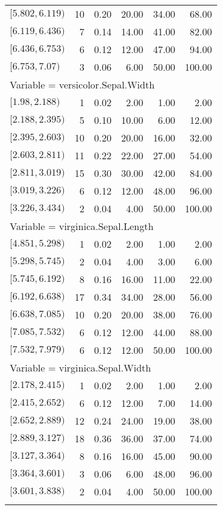 \documentclass[10pt,a4paper]{article}
\begin{document}
\begin{Schunk}
\begin{longtable}{lrrrrr}
  $[5.802,6.119)$ &  10 & 0.20 & 20.00 & 34.00 & 68.00 \\ 
  $[6.119,6.436)$ &   7 & 0.14 & 14.00 & 41.00 & 82.00 \\ 
  $[6.436,6.753)$ &   6 & 0.12 & 12.00 & 47.00 & 94.00 \\ 
  $[6.753,7.07)$ &   3 & 0.06 & 6.00 & 50.00 & 100.00 \\ 
   \hline
\multicolumn{6}{l}{Variable = versicolor.Sepal.Width}\\
$[1.98,2.188)$ &   1 & 0.02 & 2.00 & 1.00 & 2.00 \\ 
  $[2.188,2.395)$ &   5 & 0.10 & 10.00 & 6.00 & 12.00 \\ 
  $[2.395,2.603)$ &  10 & 0.20 & 20.00 & 16.00 & 32.00 \\ 
  $[2.603,2.811)$ &  11 & 0.22 & 22.00 & 27.00 & 54.00 \\ 
  $[2.811,3.019)$ &  15 & 0.30 & 30.00 & 42.00 & 84.00 \\ 
  $[3.019,3.226)$ &   6 & 0.12 & 12.00 & 48.00 & 96.00 \\ 
  $[3.226,3.434)$ &   2 & 0.04 & 4.00 & 50.00 & 100.00 \\ 
   \hline
\multicolumn{6}{l}{Variable = virginica.Sepal.Length}\\
$[4.851,5.298)$ &   1 & 0.02 & 2.00 & 1.00 & 2.00 \\ 
  $[5.298,5.745)$ &   2 & 0.04 & 4.00 & 3.00 & 6.00 \\ 
  $[5.745,6.192)$ &   8 & 0.16 & 16.00 & 11.00 & 22.00 \\ 
  $[6.192,6.638)$ &  17 & 0.34 & 34.00 & 28.00 & 56.00 \\ 
  $[6.638,7.085)$ &  10 & 0.20 & 20.00 & 38.00 & 76.00 \\ 
  $[7.085,7.532)$ &   6 & 0.12 & 12.00 & 44.00 & 88.00 \\ 
  $[7.532,7.979)$ &   6 & 0.12 & 12.00 & 50.00 & 100.00 \\ 
   \hline
\multicolumn{6}{l}{Variable = virginica.Sepal.Width}\\
$[2.178,2.415)$ &   1 & 0.02 & 2.00 & 1.00 & 2.00 \\ 
  $[2.415,2.652)$ &   6 & 0.12 & 12.00 & 7.00 & 14.00 \\ 
  $[2.652,2.889)$ &  12 & 0.24 & 24.00 & 19.00 & 38.00 \\ 
  $[2.889,3.127)$ &  18 & 0.36 & 36.00 & 37.00 & 74.00 \\ 
  $[3.127,3.364)$ &   8 & 0.16 & 16.00 & 45.00 & 90.00 \\ 
  $[3.364,3.601)$ &   3 & 0.06 & 6.00 & 48.00 & 96.00 \\ 
  $[3.601,3.838)$ &   2 & 0.04 & 4.00 & 50.00 & 100.00 \\ 
   \hline
\multicolumn{6}{l}{}\\
\hline
\end{longtable}\end{Schunk}
\end{document}
